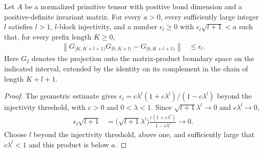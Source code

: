 \begin{lemma}
    \label{thm:primitive-prescribed-projector-defect}
    \leanok
    Let $A$ be a normalized primitive tensor with positive bond dimension
    and a positive-definite invariant matrix. For every $a>0$, every
    sufficiently large integer $l$ satisfies $l>1$, $l$-block injectivity,
    and a number $\epsilon_l\ge0$ with $\epsilon_l\sqrt{l+1}<a$
    such that, for every prefix length $K\ge0$,
    \begin{align}
        \left\|G_{\lbrack K,K+l+1)}G_{\lbrack 0,K+l)}-G_{\lbrack 0,K+l+1)}\right\|
         & \le\epsilon_l.
    \end{align}
    Here $G_I$ denotes the projection onto the matrix-product boundary
    space on the indicated interval, extended by the identity on its
    complement in the chain of length $K+l+1$.
\end{lemma}
\begin{proof}
    \leanok
    The geometric estimate gives
    $\epsilon_l=c\lambda^l(1+c\lambda^l)/(1-c\lambda^l)$ beyond the
    injectivity threshold, with $c>0$ and $0<\lambda<1$.
    Since $\sqrt{l+1}\lambda^l\to0$ and $c\lambda^l\to0$,
    \begin{align}
        \epsilon_l\sqrt{l+1}
         & =\bigl(\sqrt{l+1}\lambda^l\bigr)
        \frac{c(1+c\lambda^l)}{1-c\lambda^l}\longrightarrow0.
    \end{align}
    Choose $l$ beyond the injectivity threshold, above one, and sufficiently
    large that $c\lambda^l<1$ and this product is below $a$.
\end{proof}

